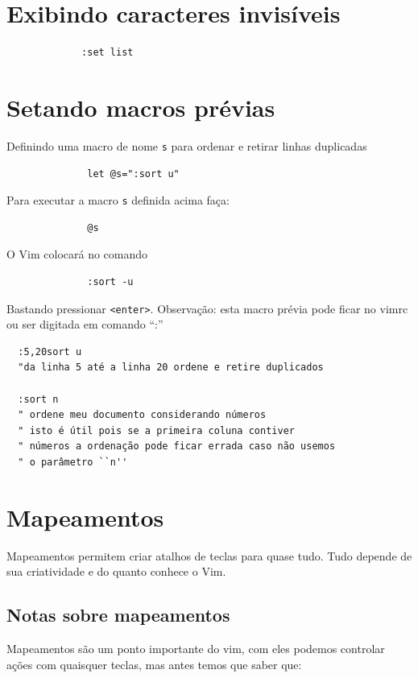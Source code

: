 \documentclass[10pt,a4paper,openany]{book}
\begin{document}
\section{Exibindo caracteres invisíveis}
\label{Exibindo caracteres invisíveis}

\begin{verbatim}
			 :set list
\end{verbatim}

\section{Setando macros prévias }
\label{Setando macros prévias }
Definindo uma macro de nome \verb|s| para ordenar e retirar linhas duplicadas

\begin{verbatim}
			  let @s=":sort u"
\end{verbatim}

Para executar a macro \verb|s| definida acima faça:

\begin{verbatim}
			  @s
\end{verbatim}

O Vim colocará no comando

\begin{verbatim}
			  :sort -u
\end{verbatim}

Bastando pressionar \verb|<enter>|.
Observação: esta macro prévia pode ficar no vimrc ou ser digitada em comando ``:''


\begin{verbatim}
  :5,20sort u
  "da linha 5 até a linha 20 ordene e retire duplicados

  :sort n
  " ordene meu documento considerando números
  " isto é útil pois se a primeira coluna contiver
  " números a ordenação pode ficar errada caso não usemos
  " o parâmetro ``n''
\end{verbatim}

\section{Mapeamentos}\label{Mapeamentos}

Mapeamentos permitem criar atalhos de teclas para quase tudo. Tudo depende de
sua criatividade e do quanto conhece o Vim. 


\subsection{Notas sobre mapeamentos}\label{Notas sobre mapeamentos}
Mapeamentos são um ponto importante do vim, com eles podemos controlar
ações com quaisquer teclas, mas antes temos que saber que:
\end{document}
